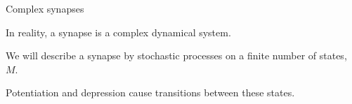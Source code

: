 \documentclass[final,hyperref={pdfpagelabels=false,bookmarks=false}]{beamer}
\begin{document}
\begin{frame}{}
\begin{columns}[t]
\begin{column}{0.36\linewidth}
\begin{block}{Complex synapses}
%
 \begin{minipage}[t]{0.51\linewidth}
   In reality, a synapse is a complex dynamical system.

   \vp We will describe a synapse by stochastic processes on a finite number of states, $M$.

   \vp Potentiation and depression cause transitions between these states.

   \vp
   \begin{center}
   \end{center}
 \end{minipage}
 \begin{minipage}[t]{0.47\linewidth}
   \begin{center}
   \end{center}


\end{minipage}
\end{block}
\end{column}
\end{columns}
\end{frame}
\end{document}
